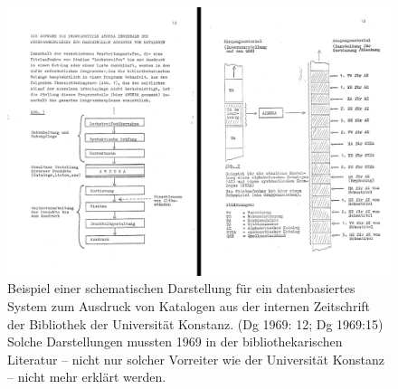 \documentclass[a4paper,
fontsize=11pt,
oneside,
numbers=noperiodatend,
parskip=half-,
bibliography=totoc,
final
]{scrartcl}
\begin{document}
\begin{figure}
\centering
\includegraphics[width=.9\textwidth]{img/dg.jpg}
\caption{Beispiel einer schematischen Darstellung für ein datenbasiertes
System zum Ausdruck von Katalogen aus der internen Zeitschrift der
Bibliothek der Universität Konstanz. (Dg 1969: 12; Dg 1969:15) Solche
Darstellungen mussten 1969 in der bibliothekarischen Literatur -- nicht
nur solcher Vorreiter wie der Universität Konstanz -- nicht mehr erklärt
werden.}
\end{figure}
\end{document}
